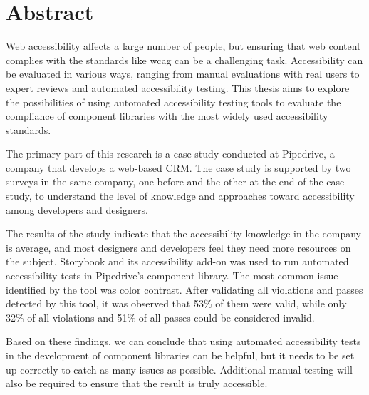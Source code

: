 \documentclass{master_thesis}
\begin{document}
\section*{Abstract}
\thispagestyle{empty}




Web accessibility affects a large number of people, but ensuring that web content complies with the standards like \ac{wcag} can be a challenging task. Accessibility can be evaluated in various ways, ranging from manual evaluations with real users to expert reviews and automated accessibility testing. This thesis aims to explore the possibilities of using automated accessibility testing tools to evaluate the compliance of component libraries with the most widely used accessibility standards.


The primary part of this research is a case study conducted at Pipedrive, a company that develops a web-based CRM. The case study is supported by two surveys in the same company, one before and the other at the end of the case study, to understand the level of knowledge and approaches toward accessibility among developers and designers.

The results of the study indicate that the accessibility knowledge in the company is average, and most designers and developers feel they need more resources on the subject. Storybook and its accessibility add-on was used to run automated accessibility tests in Pipedrive's component library. The most common issue identified by the tool was color contrast. After validating all violations and passes detected by this tool, it was observed that 53\% of them were valid, while only 32\% of all violations and 51\% of all passes could be considered invalid.


Based on these findings, we can conclude that using automated accessibility tests in the development of component libraries can be helpful, but it needs to be set up correctly to catch as many issues as possible. Additional manual testing will also be required to ensure that the result is truly accessible.
\end{document}
